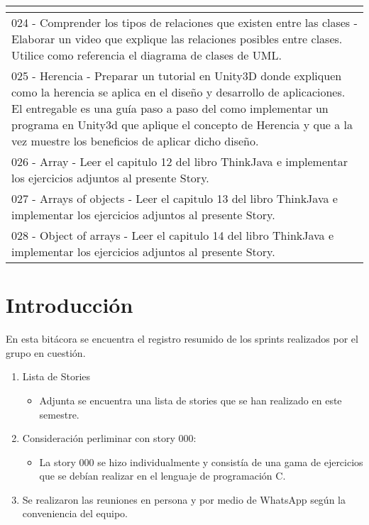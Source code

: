 \begin{center}
\begin{longtable}{ | p{18cm} | }
\begin{itemize}
        \end{itemize} \\
        \hline
        024 - Comprender los tipos de relaciones que existen entre las clases - Elaborar un video que explique las relaciones posibles entre clases. Utilice como referencia el diagrama de clases de UML. \\
        \hline
        025 - Herencia -  Preparar un tutorial en Unity3D donde expliquen como la herencia se aplica en el diseño y desarrollo de aplicaciones. \newline 
        El entregable es una guía paso a paso del como implementar un programa en Unity3d que aplique el concepto de Herencia y que a la vez muestre los beneficios de aplicar dicho diseño.  \\
        \hline
        026 - Array - Leer el capitulo 12 del libro ThinkJava e implementar los ejercicios adjuntos al presente Story. \\
        \hline
        027 - Arrays of objects - Leer el capitulo 13 del libro ThinkJava e implementar los ejercicios adjuntos al presente Story. \\
        \hline
        028 - Object of arrays - Leer el capitulo 14 del libro ThinkJava e implementar los ejercicios adjuntos al presente Story. \\ 
        \hline
   \end{longtable}
\end{center}

\section{Introducción}
En esta bitácora se encuentra el registro resumido de los sprints realizados por el grupo en cuestión. 

\begin{enumerate}
    \item Lista de Stories
        \begin{itemize}
            \item Adjunta se encuentra una lista de stories que se han realizado en este semestre.
        \end{itemize}
    
    \item Consideración perliminar con story 000:
        \begin{itemize}
            \item La story 000 se hizo individualmente y consistía de una gama de ejercicios que se debían realizar en el lenguaje de programación C.
        \end{itemize}
    
    \item Se realizaron las reuniones en persona y por medio de WhatsApp según la conveniencia del equipo.
\end{enumerate}



